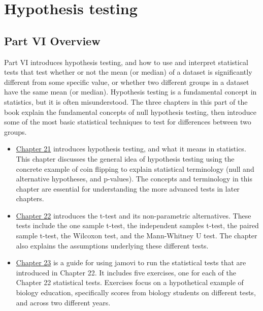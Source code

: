 \documentclass[
  openany]{scrbook}
\begin{document}
\hypertarget{part-hypothesis-testing}{%
\part{Hypothesis testing}\label{part-hypothesis-testing}}

\hypertarget{Week6}{%
\chapter*{Part VI Overview}\label{Week6}}

Part VI introduces hypothesis testing, and how to use and interpret statistical tests that test whether or not the mean (or median) of a dataset is significantly different from some specific value, or whether two different groups in a dataset have the same mean (or median).
Hypothesis testing is a fundamental concept in statistics, but it is often misunderstood.
The three chapters in this part of the book explain the fundamental concepts of null hypothesis testing, then introduce some of the most basic statistical techniques to test for differences between two groups.

\begin{itemize}
\item
  \protect\hyperlink{Chapter_21}{Chapter 21} introduces hypothesis testing, and what it means in statistics. This chapter discusses the general idea of hypothesis testing using the concrete example of coin flipping to explain statistical terminology (null and alternative hypotheses, and p-values).
  The concepts and terminology in this chapter are essential for understanding the more advanced tests in later chapters.
\item
  \protect\hyperlink{Chapter_22}{Chapter 22} introduces the t-test and its non-parametric alternatives.
  These tests include the one sample t-test, the independent samples t-test, the paired sample t-test, the Wilcoxon test, and the Mann-Whitney U test.
  The chapter also explains the assumptions underlying these different tests.
\item
  \protect\hyperlink{Chapter_23}{Chapter 23} is a guide for using jamovi to run the statistical tests that are introduced in Chapter 22.
  It includes five exercises, one for each of the Chapter 22 statistical tests.
  Exercises focus on a hypothetical example of biology education, specifically scores from biology students on different tests, and across two different years.
\end{itemize}
\end{document}
